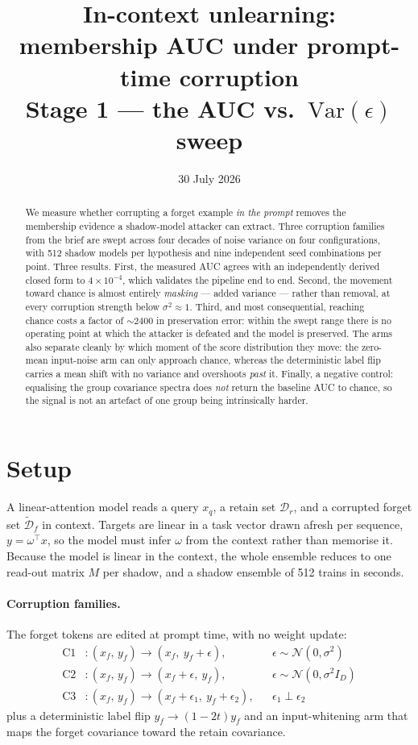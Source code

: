 \documentclass[11pt,a4paper]{article}
\title{\bfseries In-context unlearning:\\ membership AUC under prompt-time corruption\\
\large Stage 1 --- the AUC vs.\ $\mathrm{Var}(\epsilon)$ sweep}
\author{}
\date{30 July 2026}
\newcommand{\vs}{\sigma^2}
\begin{document}
\maketitle
\vspace{-2.2em}

\begin{abstract}
\noindent
We measure whether corrupting a forget example \emph{in the prompt} removes the
membership evidence a shadow-model attacker can extract. Three corruption
families from the brief are swept across four decades of noise variance on four
configurations, with 512 shadow models per hypothesis and nine independent
seed combinations per point. Three results. First, the measured AUC agrees with
an independently derived closed form to $4\times10^{-4}$, which validates the
pipeline end to end. Second, the movement toward chance is almost entirely
\emph{masking} --- added variance --- rather than removal, at every corruption
strength below $\vs\approx1$. Third, and most consequential, reaching
chance costs a factor of ${\sim}2400$ in preservation error: within the swept
range there is no operating point at which the attacker is defeated and the
model is preserved. The arms also separate cleanly by which moment of the score
distribution they move: the zero-mean input-noise arm can only approach chance,
whereas the deterministic label flip carries a mean shift with no variance and
overshoots \emph{past} it. Finally, a negative control: equalising the
group covariance spectra does \emph{not} return the baseline AUC to chance,
so the signal is not an artefact of one group being intrinsically harder.
\end{abstract}


\section{Setup}

A linear-attention model reads a query $x_q$, a retain set $\mathcal{D}_r$, and
a corrupted forget set $\widetilde{\mathcal{D}}_f$ in context. Targets are
linear in a task vector drawn afresh per sequence,
$y = \omega^{\!\top} x$, so the model must infer $\omega$ from the context
rather than memorise it. Because the model is linear in the context, the whole
ensemble reduces to one read-out matrix $M$ per shadow, and a shadow ensemble of
512 trains in seconds.

\paragraph{Corruption families.} The forget tokens are edited at prompt time,
with no weight update:
\begin{align*}
\text{C1} &: (x_f,\,y_f) \to (x_f,\ y_f+\epsilon), &&\epsilon\sim\mathcal{N}(0,\vs)\\
\text{C2} &: (x_f,\,y_f) \to (x_f+\epsilon,\ y_f), &&\epsilon\sim\mathcal{N}(0,\vs I_D)\\
\text{C3} &: (x_f,\,y_f) \to (x_f+\epsilon_1,\ y_f+\epsilon_2), &&\epsilon_1\perp\epsilon_2
\end{align*}
plus a deterministic label flip $y_f\to(1-2t)y_f$ and an input-whitening arm
that maps the forget covariance toward the retain covariance.
\end{document}
